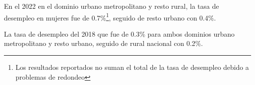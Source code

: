 En el 2022 en el dominio urbano metropolitano y resto rural, la tasa de desempleo en mujeres fue de 0.7\%\footnote{Los resultados reportados no suman el total de la tasa de desempleo debido a problemas de redondeo}, seguido de resto urbano con 0.4\%.

La tasa de desempleo del 2018 que fue de 0.3\% para ambos dominios urbano metropolitano y resto urbano, seguido de rural nacional con 0.2\%. 
